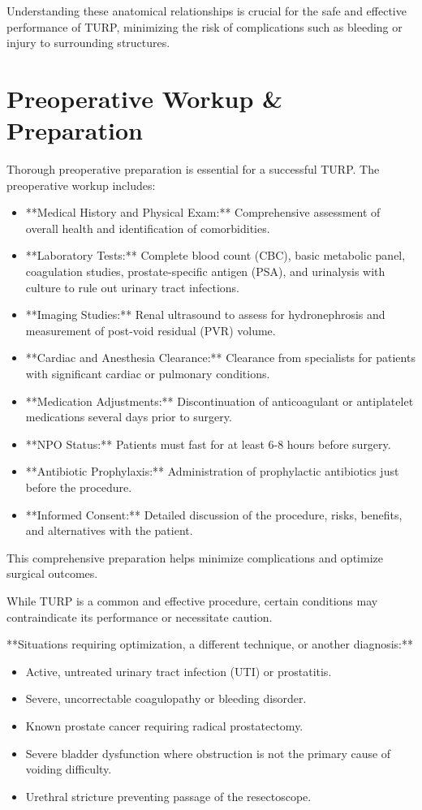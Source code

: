 Understanding these anatomical relationships is crucial for the safe and effective performance of TURP, minimizing the risk of complications such as bleeding or injury to surrounding structures.

\section*{Preoperative Workup \& Preparation}
Thorough preoperative preparation is essential for a successful TURP. The preoperative workup includes:

\begin{itemize}
  \item **Medical History and Physical Exam:** Comprehensive assessment of overall health and identification of comorbidities.
  \item **Laboratory Tests:** Complete blood count (CBC), basic metabolic panel, coagulation studies, prostate-specific antigen (PSA), and urinalysis with culture to rule out urinary tract infections.
  \item **Imaging Studies:** Renal ultrasound to assess for hydronephrosis and measurement of post-void residual (PVR) volume.
  \item **Cardiac and Anesthesia Clearance:** Clearance from specialists for patients with significant cardiac or pulmonary conditions.
  \item **Medication Adjustments:** Discontinuation of anticoagulant or antiplatelet medications several days prior to surgery.
  \item **NPO Status:** Patients must fast for at least 6-8 hours before surgery.
  \item **Antibiotic Prophylaxis:** Administration of prophylactic antibiotics just before the procedure.
  \item **Informed Consent:** Detailed discussion of the procedure, risks, benefits, and alternatives with the patient.
\end{itemize}

This comprehensive preparation helps minimize complications and optimize surgical outcomes.

While TURP is a common and effective procedure, certain conditions may contraindicate its performance or necessitate caution.

**Situations requiring optimization, a different technique, or another diagnosis:**
\begin{itemize}
  \item Active, untreated urinary tract infection (UTI) or prostatitis.
  \item Severe, uncorrectable coagulopathy or bleeding disorder.
  \item Known prostate cancer requiring radical prostatectomy.
  \item Severe bladder dysfunction where obstruction is not the primary cause of voiding difficulty.
  \item Urethral stricture preventing passage of the resectoscope.
\end{itemize}

